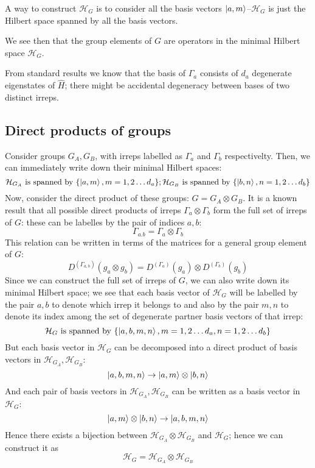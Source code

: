 \documentclass[12pt]{article}
\begin{document}
	A way to construct $\mathcal{H}_G$ is to consider all the basis vectors $\ket{a,m}$--$\mathcal{H}_G$ is just the Hilbert space spanned by all the basis vectors.
	
	We see then that the group elements of $G$ are operators in the minimal Hilbert space $\mathcal{H}_G$.
	
	From standard results we know that the basis of $\Gamma_a$ consists of $d_a$ degenerate eigenstates of $\hat{H}$; there might be accidental degeneracy between bases of two distinct irreps.
	
	\subsection{Direct products of groups}
	
	Consider groups $G_A, G_B$, with irreps labelled as $\Gamma_a$ and $\Gamma_b$ respectivelty. Then, we can immediately write down their minimal Hilbert spaces:
	$$\mathcal{H}_{G_A}\text{ is spanned by }\{\ket{a,m}, m=1,2\dots d_a\}; \mathcal{H}_{G_B}\text{ is spanned by }\{\ket{b,n}, n=1,2\dots d_b\}$$
	Now, consider the direct product of these groups: $G=G_A\otimes G_B$. It is a known result that all possible direct products of irreps $\Gamma_a\otimes\Gamma_b$ form the full set of irreps of $G$: these can be labelles by the pair of indices $a,b$:
	$$\Gamma_{a.b}=\Gamma_a\otimes\Gamma_b$$
	This relation can be written in terms of the matrices for a general group element of $G$:
	$$D^{\left(\Gamma_{a,b}\right)}(g_a \otimes g_b)=D^{\left(\Gamma_{a}\right)}(g_a) \otimes D^{\left(\Gamma_{b}\right)}(g_b)$$
	Since we can construct the full set of irreps of $G$, we can also write down its minimal Hilbert space; we see that each basis vector of $\mathcal{H}_G$ will be labelled by the pair $a,b$ to denote which irrep it belongs to and also by the pair $m,n$ to denote its index among the set of degenerate partner basis vectors of that irrep:
	$$\mathcal{H}_G\text{ is spanned by }\{\ket{a,b,m,n}, m=1,2\dots d_a,n=1,2\dots d_b\}$$
	But each basis vector in $\mathcal{H}_G$ can be decomposed into a direct product of basis vectors in $\mathcal{H}_{G_A},\mathcal{H}_{G_B}$:
	$$\ket{a,b,m,n}\to\ket{a,m}\otimes\ket{b,n}$$
	And each pair of basis vectors in $\mathcal{H}_{G_A},\mathcal{H}_{G_B}$ can be written as a basis vector in $\mathcal{H}_G$:
	$$\ket{a,m}\otimes\ket{b,n}\to\ket{a,b,m,n}$$
	Hence there exists a bijection between $\mathcal{H}_{G_A}\otimes\mathcal{H}_{G_B}$ and $\mathcal{H}_G$; hence we can construct it as
	$$\mathcal{H}_G=\mathcal{H}_{G_A}\otimes\mathcal{H}_{G_B}$$
	
\end{document}
